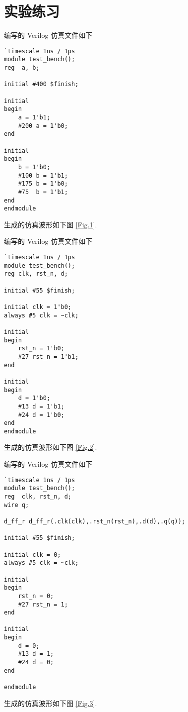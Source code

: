 \documentclass[UTF8,fontset=fandol]{ctexart}
\begin{document}
\section*{实验练习}
\begin{ExQuestions}
  \question 编写的 Verilog 仿真文件如下
  \begin{lstlisting}[style=verilogstyle, caption={题目 1 的仿真文件}, label={Code.1}]
`timescale 1ns / 1ps
module test_bench();
reg  a, b;

initial #400 $finish;

initial 
begin
    a = 1'b1;
    #200 a = 1'b0;
end

initial 
begin
    b = 1'b0;
    #100 b = 1'b1;
    #175 b = 1'b0;
    #75  b = 1'b1;
end
endmodule
  \end{lstlisting}
  生成的仿真波形如下图 \ref{Fig.1}.

  \question 编写的 Verilog 仿真文件如下
    \begin{lstlisting}[style=verilogstyle, caption={题目 2 的仿真文件}, label={Code.2}]
`timescale 1ns / 1ps
module test_bench();
reg clk, rst_n, d;

initial #55 $finish;

initial clk = 1'b0;
always #5 clk = ~clk;

initial
begin
    rst_n = 1'b0;
    #27 rst_n = 1'b1;
end

initial 
begin
    d = 1'b0;
    #13 d = 1'b1;
    #24 d = 1'b0;
end
endmodule
    \end{lstlisting}
    生成的仿真波形如下图 \ref{Fig.2}.

    \question 编写的 Verilog 仿真文件如下
    \begin{lstlisting}[style=verilogstyle, caption={题目 3 的仿真文件}, label={Code.3}]
`timescale 1ns / 1ps
module test_bench();
reg  clk, rst_n, d;
wire q;

d_ff_r d_ff_r(.clk(clk),.rst_n(rst_n),.d(d),.q(q));

initial #55 $finish;

initial clk = 0;
always #5 clk = ~clk;

initial
begin
    rst_n = 0;
    #27 rst_n = 1;
end

initial 
begin
    d = 0;
    #13 d = 1;
    #24 d = 0;
end

endmodule
    \end{lstlisting}
    生成的仿真波形如下图 \ref{Fig.3}.


\end{ExQuestions}
\end{document}
